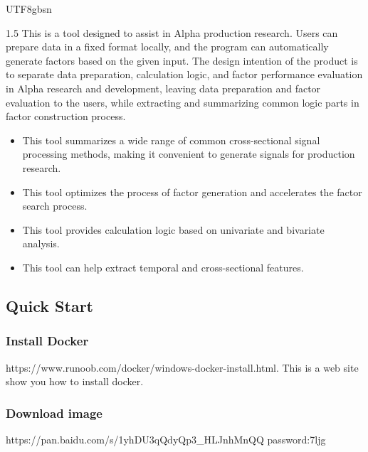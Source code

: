 \documentclass{article}
\begin{document}
\begin{CJK}{UTF8}{gbsn}
\begin{spacing}{1.5}
This is a tool designed to assist in Alpha production research. Users can prepare data in a fixed format locally, and the program can automatically generate factors based on the given input. The design intention of the product is to separate data preparation, calculation logic, and factor performance evaluation in Alpha research and development, leaving data preparation and factor evaluation to the users, while extracting and summarizing common logic parts in factor construction process.



\begin{itemize}
\item[*] This tool summarizes a wide range of common cross-sectional signal processing methods, making it convenient to generate signals for production research.
\item[*] This tool optimizes the process of factor generation and accelerates the factor search process.
\item[*] This tool provides calculation logic based on univariate and bivariate analysis. 
\item[*] This tool can help extract temporal and cross-sectional features.

\end{itemize}

\subsection{Quick Start}

\subsubsection{Install Docker}
https://www.runoob.com/docker/windows-docker-install.html. This is a web site show you how to install docker.
\subsubsection{Download image}
https://pan.baidu.com/s/1yhDU3qQdyQp3\_HLJnhMnQQ  password:7ljg
%


\end{spacing}
\end{CJK}
\end{document}
